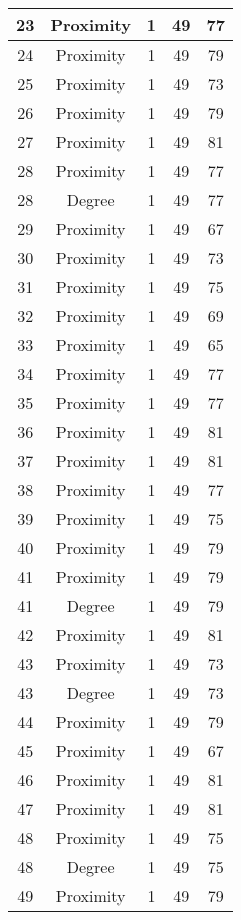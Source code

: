 \documentclass[results.tex]{subfiles}
\begin{document}
\begin{center}
\begin{tabular}{| c || c | c | c | c |}
    \hline
    23 & Proximity & 1 & 49 & 77 \\ 
    \hline
    24 & Proximity & 1 & 49 & 79 \\ 
    \hline
    25 & Proximity & 1 & 49 & 73 \\ 
    \hline
    26 & Proximity & 1 & 49 & 79 \\ 
    \hline
    27 & Proximity & 1 & 49 & 81 \\ 
    \hline
    28 & Proximity & 1 & 49 & 77 \\ 
    \hline
    28 & Degree & 1 & 49 & 77 \\ 
    \hline
    29 & Proximity & 1 & 49 & 67 \\ 
    \hline
    30 & Proximity & 1 & 49 & 73 \\ 
    \hline
    31 & Proximity & 1 & 49 & 75 \\ 
    \hline
    32 & Proximity & 1 & 49 & 69 \\ 
    \hline
    33 & Proximity & 1 & 49 & 65 \\ 
    \hline
    34 & Proximity & 1 & 49 & 77 \\ 
    \hline
    35 & Proximity & 1 & 49 & 77 \\ 
    \hline
    36 & Proximity & 1 & 49 & 81 \\ 
    \hline
    37 & Proximity & 1 & 49 & 81 \\ 
    \hline
    38 & Proximity & 1 & 49 & 77 \\ 
    \hline
    39 & Proximity & 1 & 49 & 75 \\ 
    \hline
    40 & Proximity & 1 & 49 & 79 \\ 
    \hline
    41 & Proximity & 1 & 49 & 79 \\ 
    \hline
    41 & Degree & 1 & 49 & 79 \\ 
    \hline
    42 & Proximity & 1 & 49 & 81 \\ 
    \hline
    43 & Proximity & 1 & 49 & 73 \\ 
    \hline
    43 & Degree & 1 & 49 & 73 \\ 
    \hline
    44 & Proximity & 1 & 49 & 79 \\ 
    \hline
    45 & Proximity & 1 & 49 & 67 \\ 
    \hline
    46 & Proximity & 1 & 49 & 81 \\ 
    \hline
    47 & Proximity & 1 & 49 & 81 \\ 
    \hline
    48 & Proximity & 1 & 49 & 75 \\ 
    \hline
    48 & Degree & 1 & 49 & 75 \\ 
    \hline
    49 & Proximity & 1 & 49 & 79 \\ 
    \hline   \end{tabular}
\end{center}
\end{document}
